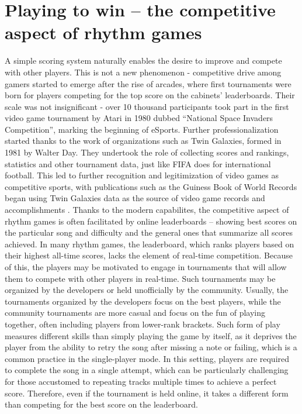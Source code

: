 \section{Playing to win -- the competitive aspect of rhythm games}
A simple scoring system naturally enables the desire to improve and compete with other players. This is not a new phenomenon - competitive drive among gamers started to emerge after the rise of arcades, where first tournaments were born for players competing for the top score on the cabinets' leaderboards. Their scale was not insignificant - over 10 thousand participants took part in the first video game tournament by Atari in 1980 dubbed ``National Space Invaders Competition'', marking the beginning of eSports. Further professionalization started thanks to the work of organizations such as Twin Galaxies, formed in 1981 by Walter Day. They undertook the role of collecting scores and rankings, statistics and other tournament data, just like FIFA does for international football. This led to further recognition and legitimization of video games as competitive sports, with publications such as the Guiness Book of World Records began using Twin Galaxies data as the source of video game records and accomplishments \cite{pioneeringesport}.  Thanks to the modern capabilites, the competitive aspect of rhythm games is often facilitated by online leaderboards -- showing best scores on the particular song and difficulty and the general ones that summarize all scores achieved. In many rhythm games, the leaderboard, which ranks players based on their highest all-time scores, lacks the element of real-time competition. Because of this, the players may be motivated to engage in tournaments that will allow them to compete with other players in real-time. Such tournaments may be organized by the developers or held unofficially by the community. Usually, the tournaments organized by the developers focus on the best players, while the community tournaments are more casual and focus on the fun of playing together, often including players from lower-rank brackets. Such form of play measures different skills than simply playing the game by itself, as it deprives the player from the ability to retry the song after missing a note or failing, which is a common practice in the single-player mode. In this setting, players are required to complete the song in a single attempt, which can be particularly challenging for those accustomed to repeating tracks multiple times to achieve a perfect score. Therefore, even if the tournament is held online, it takes a different form than competing for the best score on the leaderboard.

